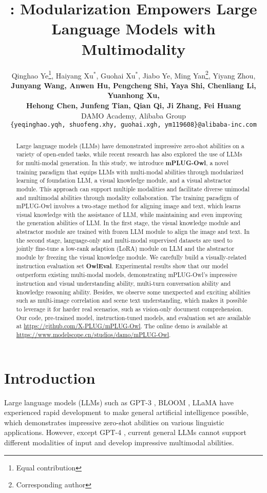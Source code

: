 \documentclass{article}
\title{\titledmodelname: Modularization Empowers Large Language Models with Multimodality}
\author{Qinghao Ye\thanks{Equal contribution}\hspace{1.5mm}, Haiyang Xu$^*$, Guohai Xu$^*$, Jiabo Ye, Ming Yan\thanks{Corresponding author}, Yiyang Zhou, \\ \textbf{Junyang Wang, Anwen Hu, Pengcheng Shi, Yaya Shi, Chenliang Li, Yuanhong Xu,} \\ \textbf{Hehong Chen, Junfeng Tian, Qian Qi, Ji Zhang, Fei Huang} \\
DAMO Academy, Alibaba Group \\
{\small \texttt{\{yeqinghao.yqh, shuofeng.xhy, guohai.xgh, ym119608\}@alibaba-inc.com}} 
}
\newcommand{\modelname}{mPLUG-Owl\xspace}
\newcommand{\evalsetname}{OwlEval\xspace}
\begin{document}
\maketitle

\begin{abstract}
Large language models (LLMs) have demonstrated impressive zero-shot abilities on a variety of open-ended tasks, while recent research has also explored the use of LLMs for multi-modal generation. In this study, we introduce \textbf{\modelname}, a novel training paradigm that equips LLMs with multi-modal abilities through modularized learning of foundation LLM, a visual knowledge module, and a visual abstractor module. This approach can support multiple modalities and facilitate diverse unimodal and multimodal abilities through modality collaboration. The training paradigm of \modelname involves a two-stage method for aligning image and text, which learns visual knowledge with the assistance of LLM, while maintaining and even improving the generation abilities of LLM. In the first stage, the visual knowledge module and abstractor module are trained with frozen LLM module to align the image and text. In the second stage, language-only and multi-modal supervised datasets are used to jointly fine-tune a low-rank adaption (LoRA) module on LLM and the abstractor module by freezing the visual knowledge module. We carefully build a visually-related instruction evaluation set \textbf{\evalsetname}. Experimental results show that our model outperform existing multi-modal models,  demonstrating \modelname's impressive instruction and visual understanding ability, multi-turn conversation ability and knowledge reasoning ability. Besides, we observe some unexpected and exciting abilities such as multi-image correlation and scene text understanding, which makes it possible to leverage it for harder real scenarios, such as vision-only document comprehension.
Our code, pre-trained model,  instruction-tuned models, and evaluation set are available at \href{https://github.com/X-PLUG/mPLUG-Owl}{https://github.com/X-PLUG/mPLUG-Owl}. The online demo is available at \href{https://www.modelscope.cn/studios/damo/mPLUG-Owl/}{https://www.modelscope.cn/studios/damo/mPLUG-Owl}.
\end{abstract}



\section{Introduction}
Large language models (LLMs) such as GPT-3 \citep{gpt3}, BLOOM \citep{bloom}, LLaMA \citep{llama} have experienced rapid development to make general artificial intelligence possible, which demonstrates impressive zero-shot abilities on various linguistic applications. However, except GPT-4 \citep{gpt4}, current general LLMs cannot support different modalities of input and develop impressive multimodal abilities. 
\end{document}
